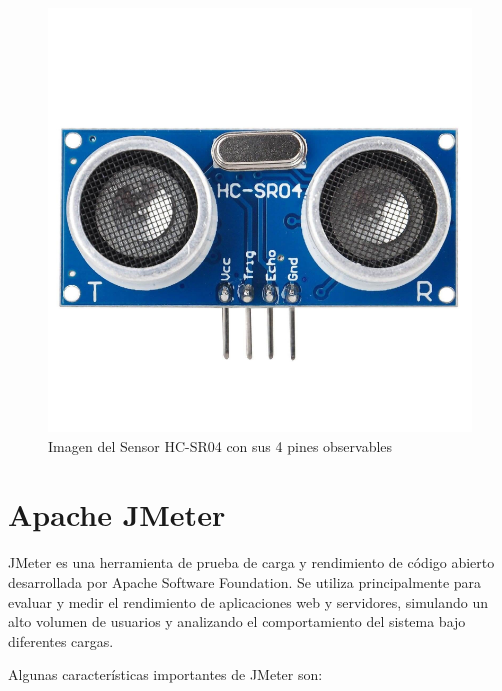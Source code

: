 \vspace{2mm}
\begin{figure}[h!]
\centering
\includegraphics[scale=0.25]{images/HC_SR04}
\caption[Sensor HC-SR04]{Imagen del Sensor HC-SR04 con sus 4 pines observables}%
\label{fig:ultrasonido}
\end{figure}

\section{Apache JMeter}

\label{JMETER} JMeter es una herramienta de prueba de carga y rendimiento de código abierto desarrollada por Apache Software Foundation. Se utiliza principalmente para evaluar y medir el rendimiento de aplicaciones web y servidores, simulando un alto volumen de usuarios y analizando el comportamiento del sistema bajo diferentes cargas.

Algunas características importantes de JMeter son:

